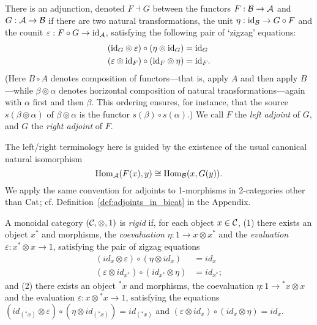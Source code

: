 \documentclass{amsart}
\begin{document}
\begin{definition} \label{def:Adjoints}
There is an adjunction, denoted $F \dashv G$ between the functors $F: \mathcal B \to \mathcal A$ and $G : \mathcal A \to \mathcal B$ if there are two natural transformations, the unit $\eta: \mathrm{id}_{\mathcal B} \to G \circ F$ and the counit $\varepsilon: F \circ G \to \mathrm{id}_{\mathcal A}$, satisfying the following pair of `zigzag' equations:
	\begin{align*}
		(\mathrm{id}_{G} \circledcirc \varepsilon  ) \circ (  \eta \circledcirc \mathrm{id}_{G}) &= \mathrm{id}_{G} \\
		(\varepsilon \circledcirc \mathrm{id}_{F}) \circ (\mathrm{id}_{F} \circledcirc \eta) &= \mathrm{id}_{F}.
	\end{align*}
(Here $B \circ A$ denotes composition of functors---that is, apply $A$ and then apply $B$---while $\beta \circledcirc \alpha$ denotes horizontal composition of natural transformations---again with $\alpha$ first and then $\beta$.  This ordering ensures, for instance, that the source $s(\beta \circledcirc \alpha)$ of $\beta \circledcirc \alpha$ is the functor $s(\beta) \circ s(\alpha)$.)  We call $F$ the \emph{left adjoint} of $G$, and $G$ the \emph{right adjoint} of $F$.
\end{definition}
\nid The left/right terminology here is guided by the existence of the usual canonical natural isomorphism
\begin{equation*}
	\operatorname{Hom}_\mathcal A(F(x), y) \cong \operatorname{Hom}_\mathcal B(x, G(y)).
\end{equation*}
We apply the same convention for adjoints to 1-morphisms in 2-categories other than $\mathrm{Cat}$; cf. Definition~\ref{def:adjoints_in_bicat} in the Appendix.

\begin{definition} \label{def:rigid}
	A monoidal category $(\mathcal C, \otimes, 1)$ is {\em rigid} if, for each object $x \in \mathcal C$, (1) there exists an object $x^*$ and morphisms, the {\em coevaluation} $\eta: 1 \to x \otimes x^*$ and the {\em evaluation} $\varepsilon: x^* \otimes x \to 1$, satisfying the pair of zigzag equations
	\begin{align*}
		(id_{x} \otimes \varepsilon  ) \circ (  \eta \otimes id_{x}) &= id_{x} \\
		(\varepsilon \otimes id_{x^*}) \circ (id_{x^*} \otimes \eta) &= id_{x^*};
	\end{align*}
and (2) there exists an object ${}^* x$ and morphisms,
the coevaluation $\eta: 1 \to {}^* x \otimes x$ and the evaluation $\varepsilon: x \otimes {}^* x \to 1$, satisfying the equations
$		(id_{({}^* x)} \otimes \varepsilon  ) \circ (  \eta \otimes id_{({}^* x)}) = id_{({}^* x)}$
and $		(\varepsilon \otimes id_{x}) \circ (id_{x} \otimes \eta) = id_{x}.$
\end{definition}
\end{document}
